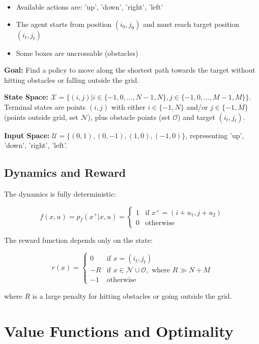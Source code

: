\documentclass[openany]{book}
\theoremstyle{definition}
\theoremstyle{remark}
\begin{document}
\begin{itemize}
    \item Available actions are: 'up', 'down', 'right', 'left'
    \item The agent starts from position $(i_0,j_0)$ and must reach target position $(i_t,j_t)$
    \item Some boxes are uncrossable (obstacles)
\end{itemize}

\textbf{Goal:} Find a policy to move along the shortest path towards the target without hitting obstacles or falling outside the grid.

\textbf{State Space:} $\mathcal{X} = \{(i,j)|i \in \{-1,0,\ldots,N-1,N\}, j \in \{-1,0,\ldots,M-1,M\}\}$. Terminal states are points $(i,j)$ with either $i \in \{-1,N\}$ and/or $j \in \{-1,M\}$ (points outside grid, set $\mathcal{N}$), plus obstacle points (set $\mathcal{O}$) and target $(i_t,j_t)$.

\textbf{Input Space:} $\mathcal{U} = \{(0,1),(0,-1),(1,0),(-1,0)\}$, representing 'up', 'down', 'right', 'left'.

\subsection{Dynamics and Reward}
The dynamics is fully deterministic:

\[
f(x,u) = p_f(x^+|x,u) = \begin{cases}
1 & \text{if } x^+ = (i+u_1,j+u_2) \\
0 & \text{otherwise}
\end{cases}
\]

The reward function depends only on the state:

\[
r(x) = \begin{cases}
0 & \text{if } x = (i_t,j_t) \\
-R & \text{if } x \in \mathcal{N} \cup \mathcal{O}, \text{ where } R \gg N + M \\
-1 & \text{otherwise}
\end{cases}
\]

where $R$ is a large penalty for hitting obstacles or going outside the grid.

\section{Value Functions and Optimality}
\end{document}
